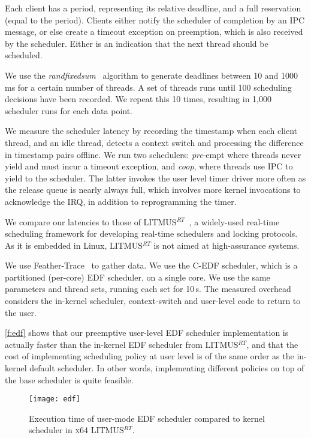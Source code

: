 Each client has a period, representing its relative deadline, and a full reservation (equal to the period). Clients
either notify the scheduler of completion by an IPC
message, or else create a timeout exception on preemption, which is also received by the
scheduler. Either is an indication that the next thread should be scheduled.

We use the \emph{randfixedsum}~\citep{Emberson_SD_10} algorithm to
generate deadlines between 10 and 1000\,ms for a certain number of threads.
A set of threads runs until 100
scheduling decisions have been recorded. We repeat this 10 times,
resulting in 1,000 scheduler runs for each data point.

We measure the scheduler latency by recording the timestamp when each client thread, and an idle
thread, detects a
context switch and processing the difference in timestamp pairs offline. We run two schedulers:
\emph{pre}-empt where threads never yield and must incur a timeout exception, and \emph{coop}, where
threads use IPC to yield to the scheduler. The latter invokes the user level timer
driver more often as the release queue is nearly always full, which involves more kernel invocations
to acknowledge the IRQ, in addition to reprogramming the timer.

We compare our latencies to those of
LITMUS$^{RT}$~\citep{Calandrino_LBDA_06}, a widely-used real-time scheduling
framework for developing real-time schedulers and locking protocols. 
As it is  embedded in Linux, LITMUS$^{RT}$ is not aimed at high-assurance systems.

We use Feather-Trace~\citep{Brandenburg_Anderson_07} to gather data.
We use the C-EDF scheduler, which is a partitioned (per-core) EDF scheduler, on a single
core. We use the same parameters and thread sets, running each set for 10\,s. 
The measured overhead considers the in-kernel scheduler, context-switch and user-level code to return to
the user.

\autoref{f:edf} shows that our preemptive user-level EDF scheduler implementation is
actually faster than the in-kernel EDF scheduler from LITMUS$^{RT}$, and
that the cost of implementing scheduling policy at user level is of
the same order as the in-kernel default scheduler. In other words,
implementing different policies on top of the base scheduler is quite feasible.

\begin{figure}[t]
    \centering
    \texttt{[image: edf]}
    \caption{Execution time of \selfour user-mode EDF scheduler compared to
             kernel scheduler in \textsc{x64} LITMUS$^{RT}$.}
    \label{f:edf}
\end{figure}

